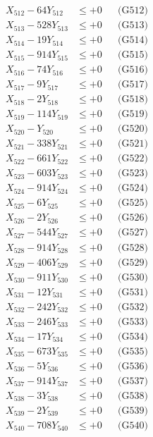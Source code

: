 \documentclass[a4paper,10pt]{article}
\begin{document}
{\begin{align}
X_{512} - 64Y_{512} &\leq +0 && \text{(G512)} \\
X_{513} - 528Y_{513} &\leq +0 && \text{(G513)} \\
X_{514} - 19Y_{514} &\leq +0 && \text{(G514)} \\
X_{515} - 914Y_{515} &\leq +0 && \text{(G515)} \\
X_{516} - 74Y_{516} &\leq +0 && \text{(G516)} \\
X_{517} - 9Y_{517} &\leq +0 && \text{(G517)} \\
X_{518} - 2Y_{518} &\leq +0 && \text{(G518)} \\
X_{519} - 114Y_{519} &\leq +0 && \text{(G519)} \\
X_{520} - Y_{520} &\leq +0 && \text{(G520)} \\
\allowbreak
X_{521} - 338Y_{521} &\leq +0 && \text{(G521)} \\
X_{522} - 661Y_{522} &\leq +0 && \text{(G522)} \\
X_{523} - 603Y_{523} &\leq +0 && \text{(G523)} \\
X_{524} - 914Y_{524} &\leq +0 && \text{(G524)} \\
X_{525} - 6Y_{525} &\leq +0 && \text{(G525)} \\
X_{526} - 2Y_{526} &\leq +0 && \text{(G526)} \\
X_{527} - 544Y_{527} &\leq +0 && \text{(G527)} \\
X_{528} - 914Y_{528} &\leq +0 && \text{(G528)} \\
X_{529} - 406Y_{529} &\leq +0 && \text{(G529)} \\
X_{530} - 911Y_{530} &\leq +0 && \text{(G530)} \\
\allowbreak
X_{531} - 12Y_{531} &\leq +0 && \text{(G531)} \\
X_{532} - 242Y_{532} &\leq +0 && \text{(G532)} \\
X_{533} - 246Y_{533} &\leq +0 && \text{(G533)} \\
X_{534} - 17Y_{534} &\leq +0 && \text{(G534)} \\
X_{535} - 673Y_{535} &\leq +0 && \text{(G535)} \\
X_{536} - 5Y_{536} &\leq +0 && \text{(G536)} \\
X_{537} - 914Y_{537} &\leq +0 && \text{(G537)} \\
X_{538} - 3Y_{538} &\leq +0 && \text{(G538)} \\
X_{539} - 2Y_{539} &\leq +0 && \text{(G539)} \\
X_{540} - 708Y_{540} &\leq +0 && \text{(G540)} \\

\end{align}}
\end{document}
